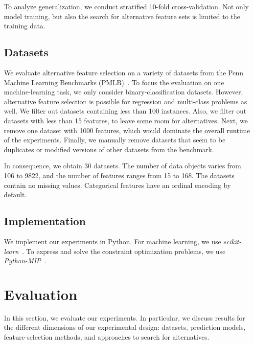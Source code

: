 \documentclass[conference]{IEEEtran}
\theoremstyle{definition}
\begin{document}
To analyze generalization, we conduct stratified 10-fold cross-validation.
Not only model training, but also the search for alternative feature sets is limited to the training data.

\subsection{Datasets}
\label{sec:experimental-design:datasets}

We evaluate alternative feature selection on a variety of datasets from the Penn Machine Learning Benchmarks (PMLB)~\cite{olson2017pmlb,romano2021pmlb}.
To focus the evaluation on one machine-learning task, we only consider binary-classification datasets.
However, alternative feature selection is possible for regression and multi-class problems as well.
We filter out datasets containing less than 100 instances.
Also, we filter out datasets with less than 15 features, to leave some room for alternatives.
Next, we remove one dataset with 1000 features, which would dominate the overall runtime of the experiments.
Finally, we manually remove datasets that seem to be duplicates or modified versions of other datasets from the benchmark.

In consequence, we obtain 30 datasets.
The number of data objects varies from 106 to 9822, and the number of features ranges from 15 to 168.
The datasets contain no missing values.
Categorical features have an ordinal encoding by default.

\subsection{Implementation}
\label{sec:experimental-design:implementation}

We implement our experiments in Python.
For machine learning, we use \emph{scikit-learn}~\cite{pedregosa2011scikit-learn}.
To express and solve the constraint optimization problems, we use \emph{Python-MIP}~\cite{python-mip}.

\section{Evaluation}
\label{sec:evaluation}

In this section, we evaluate our experiments.
In particular, we discuss results for the different dimensions of our experimental design:
datasets, prediction models, feature-selection methods, and approaches to search for alternatives.
\end{document}
